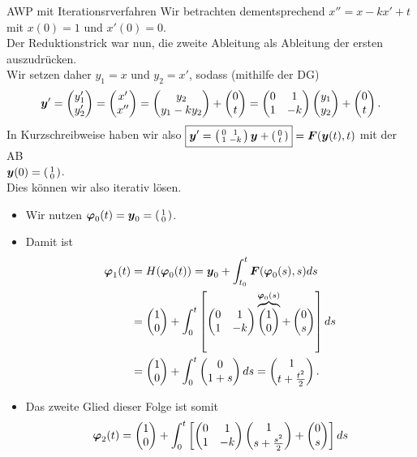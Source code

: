 \begin{Beispiel}
{AWP mit Iterationsrverfahren}
Wir betrachten dementsprechend $\boxed{x''=x-kx'+t}$ mit $x(0)=1$ und $x'(0)=0$.\\
Der Reduktionstrick war nun, die zweite Ableitung als Ableitung der ersten auszudrücken.\\
Wir setzen daher $y_1=x$ und $y_2=x'$, sodass (mithilfe der DG)
\begin{equation*}
    \yvec'=\Matrix{y_1'\\y_2'}=\Matrix{x'\\x''}=\Matrix{y_2\\y_1-ky_2}+\Matrix{0\\t}=\Matrix{0&1\\1&-k}\Matrix{y_1\\y_2}+\Matrix{0\\t}.
\end{equation*}
In Kurzschreibweise haben wir also $\boxed{\yvec'=\MatrixInline{0&1\\1&-k}\yvec+\MatrixInline{0\\t}}=\Fvec(\yvec(t),t)$ mit der AB\\
$\yvec(0)=\MatrixInline{1\\0}$.\\
Dies können wir also iterativ lösen.
\begin{itemize}
    \item Wir nutzen $\varphivec_0(t)=\yvec_0=\MatrixInline{1\\0}$.
    \item Damit ist
    \begin{align*}
        \varphivec_1(t)&=H(\varphivec_0(t))=\yvec_0+\int_{t_0}^t\Fvec(\varphivec_0(s),s)ds\\
        &=\Matrix{1\\0}+\int_0^t\BracedInSqr{\Matrix{0&1\\1&-k}\overbrace{\Matrix{1\\0}}^{\varphivec_0(s)}+\Matrix{0\\s}}ds\\
        &=\Matrix{1\\0}+\int_0^t\Matrix{0\\1+s}ds=\Matrix{1\\t+\frac{t^2}{2}}.
    \end{align*}
    \item Das zweite Glied dieser Folge ist somit
    \begin{align*}
        \varphivec_2(t)&=\Matrix{1\\0}+\int_0^t\BracedInSqr{\Matrix{0&1\\1&-k}\Matrix{1\\s+\frac{s^2}{2}}+\Matrix{0\\s}}ds\\

\end{align*}
\end{itemize}
\end{Beispiel}
